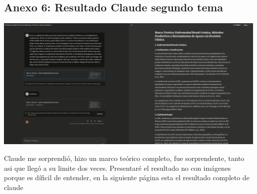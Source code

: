 \documentclass{article}
\begin{document}
\subsection{Anexo 6: Resultado Claude segundo tema}
\begin{center}
    \includegraphics[width=\textwidth]{../claude_marco_1.png}\\
\end{center}
Claude me sorprendió, hizo un marco teórico completo, fue
sorprendente, tanto asi que llegó a su limite dos veces.
Presentaré el resultado no con imágenes porque es díficil de
entender, en la siguiente página esta el resultado completo de claude
\end{document}

